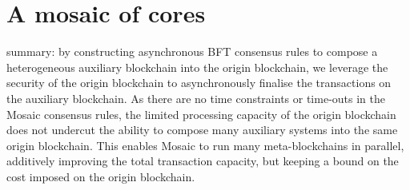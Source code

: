 \documentclass[12pt,a4paper]{article}
\begin{document}
%
%
\section{A mosaic of cores}

summary:
by constructing asynchronous BFT consensus rules to compose a heterogeneous auxiliary blockchain into the origin blockchain, we leverage the security of the origin blockchain to asynchronously finalise the transactions on the auxiliary blockchain.
As there are no time constraints or time-outs in the Mosaic consensus rules, the limited processing capacity of the origin blockchain does not undercut the ability to compose many auxiliary systems into the same origin blockchain.
This enables Mosaic to run many meta-blockchains in parallel, additively improving the total transaction capacity, but keeping a bound on the cost imposed on the origin blockchain.
%
%
\end{document}
